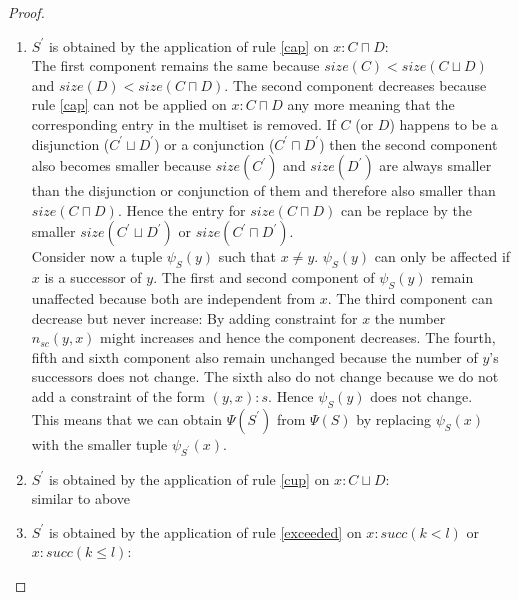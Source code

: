 \documentclass[a4paper,11pt]{scrartcl}
\theoremstyle{break}
\theoremstyle{definition}
\begin{document}
\begin{proof}$ $\\
\vspace*{-5mm}
\begin{enumerate}
\item $S^\prime$ is obtained by the application of rule \ref{cap} on $x:C\sqcap D$:\\
The first component remains the same because $size(C)<size(C\sqcup D)$ and $size(D)<size(C\sqcap D)$. The second component decreases because rule \ref{cap} can not be applied on $x:C\sqcap D$ any more meaning that the corresponding entry in the multiset is removed. If $C$ (or $D$) happens to be a disjunction ($C^\prime\sqcup D^\prime$) or a conjunction ($C^\prime\sqcap D^\prime$) then the second component also becomes smaller because $size(C^\prime)$ and $size(D^\prime)$ are always smaller than the disjunction or conjunction of them and therefore also smaller than $size(C\sqcap D)$. Hence the entry for $size(C\sqcap D)$ can be replace by the smaller $size(C^\prime\sqcup D^\prime)$ or $size(C^\prime\sqcap D^\prime)$.\\
Consider now a tuple $\psi_S(y)$ such that $x\neq y$. $\psi_S(y)$ can only be affected if $x$ is a successor of $y$. The first and second component of $\psi_S(y)$ remain unaffected because both are independent from $x$. The third component can decrease but never increase: By adding constraint for $x$ the number $n_{sc}(y,x)$ might increases and hence the component decreases. The fourth, fifth and sixth component also remain unchanged because the number of $y$'s successors does not change. The sixth also do not change because we do not add a constraint of the form $(y,x):s$. Hence $\psi_S(y)$ does not change.\\
This means that we can obtain $\Psi(S^\prime)$ from $\Psi(S)$ by replacing $\psi_S(x)$ with the smaller tuple $\psi_{S^\prime}(x)$. 
\item $S^\prime$ is obtained by the application of rule \ref{cup} on $x:C\sqcup D$:\\
similar to above
\item $S^\prime$ is obtained by the application of rule \ref{exceeded} on $x:succ(k<l)$ or $x:succ(k\leq l)$:\\

\end{enumerate}
\end{proof}
\end{document}
